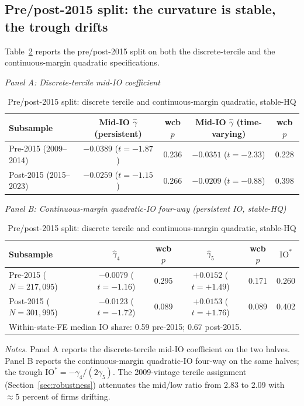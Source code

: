 \subsection{Pre/post-2015 split: the curvature is stable, the trough drifts}
\label{sec:prepost}

Table~\ref{tab:prepost} reports the pre/post-2015 split on both the discrete-tercile and the continuous-margin quadratic specifications.

\begin{table}[t]
\centering
\caption{Pre/post-2015 split: discrete tercile and continuous-margin quadratic, stable-HQ}
\label{tab:prepost}
\footnotesize
\begin{minipage}{\textwidth}
\centering
\textit{Panel A: Discrete-tercile mid-IO coefficient}\\[2pt]
\begin{tabular}{lcccc}
\toprule
Subsample & Mid-IO $\hat\gamma$ (persistent) & wcb $p$ & Mid-IO $\hat\gamma$ (time-varying) & wcb $p$ \\
\midrule
Pre-2015 (2009--2014)  & $-0.0389$ ($t=-1.87$) & 0.236 & $-0.0351$ ($t=-2.33$) & 0.228 \\
Post-2015 (2015--2023) & $-0.0259$ ($t=-1.15$) & 0.266 & $-0.0209$ ($t=-0.88$) & 0.398 \\
\bottomrule
\end{tabular}

\medskip
\textit{Panel B: Continuous-margin quadratic-IO four-way (persistent IO, stable-HQ)}\\[2pt]
\begin{tabular}{lccccc}
\toprule
Subsample & $\hat\gamma_{4}$ & wcb $p$ & $\hat\gamma_{5}$ & wcb $p$ & $\mathrm{IO}^{\ast}$ \\
\midrule
Pre-2015 ($N = 217{,}095$)   & $-0.0079$ ($t=-1.16$) & 0.295 & $+0.0152$ ($t=+1.49$) & 0.171 & 0.260 \\
Post-2015 ($N = 301{,}995$)  & $-0.0123$ ($t=-1.72$) & 0.089 & $+0.0153$ ($t=+1.76$) & 0.089 & 0.402 \\
\midrule
\multicolumn{6}{l}{Within-state-FE median IO share: 0.59 pre-2015; 0.67 post-2015.} \\
\bottomrule
\end{tabular}
\end{minipage}

\medskip
{\footnotesize\textit{Notes.} Panel A reports the discrete-tercile mid-IO coefficient on the two halves. Panel B reports the continuous-margin quadratic-IO four-way on the same halves; the trough $\mathrm{IO}^{\ast} = -\gamma_{4}/(2\gamma_{5})$. The 2009-vintage tercile assignment (Section~\ref{sec:robustness}) attenuates the mid/low ratio from 2.83 to 2.09 with $\approx 5$ percent of firms drifting.}
\end{table}

